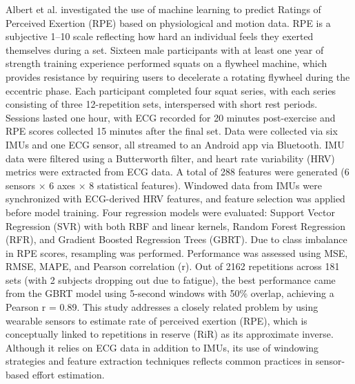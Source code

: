 \documentclass[conference]{IEEEtran}
\begin{document}
Albert et al. \cite{albert2021using} investigated the use of machine learning to predict Ratings of Perceived Exertion (RPE) based on physiological and motion data. RPE is a subjective 1--10 scale reflecting how hard an individual feels they exerted themselves during a set. Sixteen male participants with at least one year of strength training experience performed squats on a flywheel machine, which provides resistance by requiring users to decelerate a rotating flywheel during the eccentric phase. Each participant completed four squat series, with each series consisting of three 12-repetition sets, interspersed with short rest periods. Sessions lasted one hour, with ECG recorded for 20 minutes post-exercise and RPE scores collected 15 minutes after the final set. Data were collected via six IMUs and one ECG sensor, all streamed to an Android app via Bluetooth. IMU data were filtered using a Butterworth filter, and heart rate variability (HRV) metrics were extracted from ECG data. A total of 288 features were generated (6 sensors $\times$ 6 axes $\times$ 8 statistical features). Windowed data from IMUs were synchronized with ECG-derived HRV features, and feature selection was applied before model training. Four regression models were evaluated: Support Vector Regression (SVR) with both RBF and linear kernels, Random Forest Regression (RFR), and Gradient Boosted Regression Trees (GBRT). Due to class imbalance in RPE scores, resampling was performed. Performance was assessed using MSE, RMSE, MAPE, and Pearson correlation (r). Out of 2162 repetitions across 181 sets (with 2 subjects dropping out due to fatigue), the best performance came from the GBRT model using 5-second windows with 50\% overlap, achieving a Pearson r = 0.89. This study addresses a closely related problem by using wearable sensors to estimate rate of perceived exertion (RPE), which is conceptually linked to repetitions in reserve (RiR) as its approximate inverse. Although it relies on ECG data in addition to IMUs, its use of windowing strategies and feature extraction techniques reflects common practices in sensor-based effort estimation.
\end{document}
